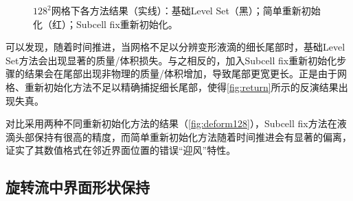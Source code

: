 \documentclass[11pt]{article}
\begin{document}
\begin{figure}[h]
    \centering
    \caption{\label{fig:deform128}$128^2$网格下各方法结果（实线）：基础Level Set（黑）；简单重新初始化（红）；Subcell fix重新初始化。}
\end{figure}

可以发现，随着时间推进，当网格不足以分辨变形液滴的细长尾部时，基础Level Set方法会出现显著的质量/体积损失。与之相反的，加入Subcell fix重新初始化步骤的结果会在尾部出现非物理的质量/体积增加，导致尾部更宽更长。正是由于网格、重新初始化方法不足以精确捕捉细长尾部，使得\autoref{fig:return}所示的反演结果出现失真。

对比采用两种不同重新初始化方法的结果（\autoref{fig:deform128}），Subcell fix方法在液滴头部保持有很高的精度，而简单重新初始化方法随着时间推进会有显著的偏离，证实了其数值格式在邻近界面位置的错误“迎风”特性。

\subsection{\label{subsec:rotation}旋转流中界面形状保持}
\end{document}
